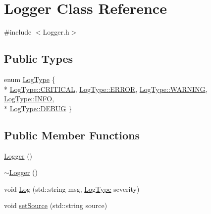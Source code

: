 \hypertarget{class_logger}{}\section{Logger Class Reference}
\label{class_logger}


{\ttfamily \#include $<$Logger.\+h$>$}

\subsection*{Public Types}
\begin{DoxyCompactItemize}
\item 
enum \hyperlink{class_logger_a8f625bd9ec5f706cb67b725a98743c04}{Log\+Type} \{ \\*
\hyperlink{class_logger_a8f625bd9ec5f706cb67b725a98743c04a99cd1c61610c76a57cb8d10d6df6b870}{Log\+Type\+::\+C\+R\+I\+T\+I\+C\+AL}, 
\hyperlink{class_logger_a8f625bd9ec5f706cb67b725a98743c04abb1ca97ec761fc37101737ba0aa2e7c5}{Log\+Type\+::\+E\+R\+R\+OR}, 
\hyperlink{class_logger_a8f625bd9ec5f706cb67b725a98743c04a059e9861e0400dfbe05c98a841f3f96b}{Log\+Type\+::\+W\+A\+R\+N\+I\+NG}, 
\hyperlink{class_logger_a8f625bd9ec5f706cb67b725a98743c04a551b723eafd6a31d444fcb2f5920fbd3}{Log\+Type\+::\+I\+N\+FO}, 
\\*
\hyperlink{class_logger_a8f625bd9ec5f706cb67b725a98743c04adc30ec20708ef7b0f641ef78b7880a15}{Log\+Type\+::\+D\+E\+B\+UG}
 \}
\end{DoxyCompactItemize}
\subsection*{Public Member Functions}
\begin{DoxyCompactItemize}
\item 
\hyperlink{class_logger_abc41bfb031d896170c7675fa96a6b30c}{Logger} ()
\item 
\hyperlink{class_logger_acb668a9e186a25fbaad2e4af6d1ed00a}{$\sim$\+Logger} ()
\item 
void \hyperlink{class_logger_a053de045cd00393f4def7d5b6c5cab38}{Log} (std\+::string msg, \hyperlink{class_logger_a8f625bd9ec5f706cb67b725a98743c04}{Log\+Type} severity)
\item 
void \hyperlink{class_logger_a5adf33889fdf061aa0dc756d38eb5e90}{set\+Source} (std\+::string source)
\end{DoxyCompactItemize}
